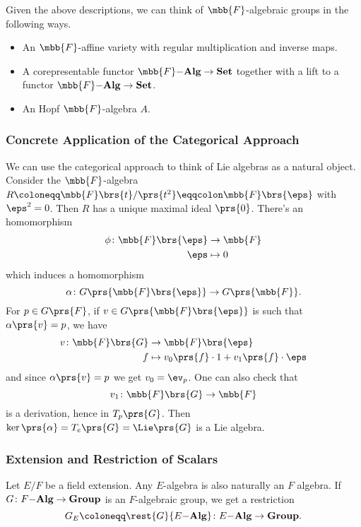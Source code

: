 \documentclass[10pt,a4paper,twoside,openany,hidelinks]{book}
\begin{document}
\begin{remark}
Given the above descriptions, we can think of $\mbb{F}$-algebraic groups in the following ways.

\begin{itemize}
\item  An $\mbb{F}$-affine variety with regular multiplication and inverse maps.
\item A corepresentable functor $\mbb{F}\mbf{-Alg} \to \mbf{Set}$ together with a lift to a functor $\mbb{F}\mbf{-Alg} \to \mbf{Set}$.
\item An Hopf $\mbb{F}$-algebra $A$.
\end{itemize}
\end{remark}

\subsubsection{Concrete Application of the Categorical Approach}

We can use the categorical approach to think of Lie algebras as a natural object.
Consider the $\mbb{F}$-algebra $R \coloneqq \mbb{F}\brs{t} / \prs{t^2} \eqqcolon \mbb{F}\brs{\eps}$ with $\eps^2 = 0$. Then $R$ has a unique maximal ideal $\prs{0}$.
There's an homomorphism
\begin{align*}
\phi \colon \mbb{F}\brs{\eps} &\to \mbb{F} \\
\eps &\mapsto 0
\end{align*}
which induces a homomorphism
\[\alpha \colon G\prs{\mbb{F}\brs{\eps}} \to G\prs{\mbb{F}} \text{.}\]
For $p \in G\prs{F}$, if $v \in G\prs{\mbb{F}\brs{\eps}}$ is such that $\alpha\prs{v} = p$, we have
\begin{align*}
v \colon \mbb{F}\brs{G} &\to \mbb{F}\brs{\eps} \\
f &\mapsto v_0\prs{f} \cdot 1 + v_1\prs{f} \cdot \eps
\end{align*}
and since $\alpha\prs{v} = p$ we get $v_0 = \ev_p$.
One can also check that
\[v_1 \colon \mbb{F}\brs{G} \to \mbb{F}\]
is a derivation, hence in $T_p\prs{G}$.
Then $\ker\prs{\alpha} = T_e\prs{G} = \Lie\prs{G}$ is a Lie algebra.


\subsubsection{Extension and Restriction of Scalars}

Let $E / F$ be a field extension. Any $E$-algebra is also naturally an $F$ algebra. If $G \colon F\mathbf{-Alg} \to \mathbf{Group}$ is an $F$-algebraic group, we get a restriction
\[G_E \coloneqq \rest{G}{E\mbf{-Alg}} \colon E\mbf{-Alg} \to \mbf{Group} \text{.}\]
\end{document}
